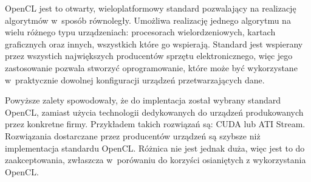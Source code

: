 OpenCL jest to otwarty, wieloplatformowy standard pozwalający na realizację algorytmów w~sposób równoległy. Umożliwa realizację jednego algorytmu na wielu różnego typu urządzeniach: procesorach wielordzeniowych, kartach graficznych oraz innych, wszystkich które go wspierają. Standard jest wspierany przez wszystich największych producentów sprzętu elektronicznego, więc jego zastosowanie pozwala stworzyć oprogramowanie, które może być wykorzystane w~praktycznie dowolnej konfiguracji urządzeń przetwarzających dane.

Powyższe zalety spowodowały, że do implentacja został wybrany standard OpenCL, zamiast użycia technologii dedykowanych do urządzeń produkowanych przez konkretne firmy. Przykładem takich rozwiązań są: CUDA lub ATI Stream. Rozwiązania dostarczane przez producentów urządzeń są szybsze niż implementacja standardu OpenCL. Różnica nie jest jednak duża, więc jest to do zaakceptowania, zwłaszcza w~porówaniu do korzyści osianiętych z wykorzystania OpenCL.


